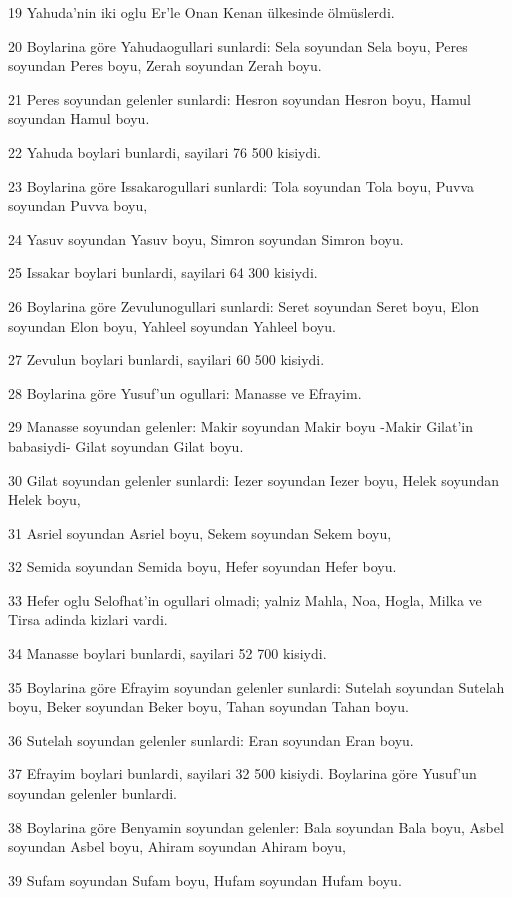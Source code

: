 \par 19 Yahuda'nin iki oglu Er'le Onan Kenan ülkesinde ölmüslerdi.
\par 20 Boylarina göre Yahudaogullari sunlardi: Sela soyundan Sela boyu, Peres soyundan Peres boyu, Zerah soyundan Zerah boyu.
\par 21 Peres soyundan gelenler sunlardi: Hesron soyundan Hesron boyu, Hamul soyundan Hamul boyu.
\par 22 Yahuda boylari bunlardi, sayilari 76 500 kisiydi.
\par 23 Boylarina göre Issakarogullari sunlardi: Tola soyundan Tola boyu, Puvva soyundan Puvva boyu,
\par 24 Yasuv soyundan Yasuv boyu, Simron soyundan Simron boyu.
\par 25 Issakar boylari bunlardi, sayilari 64 300 kisiydi.
\par 26 Boylarina göre Zevulunogullari sunlardi: Seret soyundan Seret boyu, Elon soyundan Elon boyu, Yahleel soyundan Yahleel boyu.
\par 27 Zevulun boylari bunlardi, sayilari 60 500 kisiydi.
\par 28 Boylarina göre Yusuf'un ogullari: Manasse ve Efrayim.
\par 29 Manasse soyundan gelenler: Makir soyundan Makir boyu -Makir Gilat'in babasiydi- Gilat soyundan Gilat boyu.
\par 30 Gilat soyundan gelenler sunlardi: Iezer soyundan Iezer boyu, Helek soyundan Helek boyu,
\par 31 Asriel soyundan Asriel boyu, Sekem soyundan Sekem boyu,
\par 32 Semida soyundan Semida boyu, Hefer soyundan Hefer boyu.
\par 33 Hefer oglu Selofhat'in ogullari olmadi; yalniz Mahla, Noa, Hogla, Milka ve Tirsa adinda kizlari vardi.
\par 34 Manasse boylari bunlardi, sayilari 52 700 kisiydi.
\par 35 Boylarina göre Efrayim soyundan gelenler sunlardi: Sutelah soyundan Sutelah boyu, Beker soyundan Beker boyu, Tahan soyundan Tahan boyu.
\par 36 Sutelah soyundan gelenler sunlardi: Eran soyundan Eran boyu.
\par 37 Efrayim boylari bunlardi, sayilari 32 500 kisiydi. Boylarina göre Yusuf'un soyundan gelenler bunlardi.
\par 38 Boylarina göre Benyamin soyundan gelenler: Bala soyundan Bala boyu, Asbel soyundan Asbel boyu, Ahiram soyundan Ahiram boyu,
\par 39 Sufam soyundan Sufam boyu, Hufam soyundan Hufam boyu.

